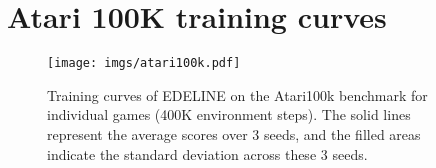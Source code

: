 \section{Atari 100K training curves}
\label{appendix:atari_100k_curve}
\begin{figure}[h!]
    \centering
    \texttt{[image: imgs/atari100k.pdf]}
    \caption{Training curves of EDELINE on the Atari100k benchmark for individual games (400K environment steps). The solid lines represent the average scores over 3 seeds, and the filled areas indicate the standard deviation across these 3 seeds.}
    \label{fig:atari100k_curves}
\end{figure}